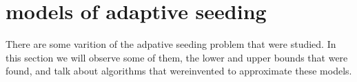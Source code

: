 \section{models of adaptive seeding}\label{sec:models}
There are some varition of the adpative seeding problem that were studied. In this section we will observe some of them, the lower and upper bounds that were found, and talk about algorithms that wereinvented to approximate these models.

